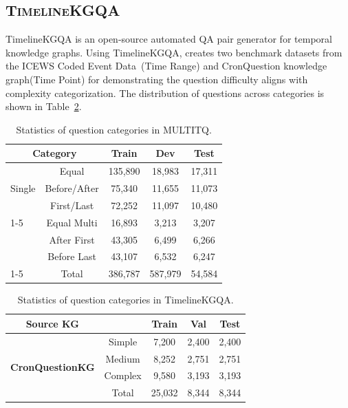 \documentclass[11pt]{article}
\begin{document}
\subsection{\textsc{TimelineKGQA}}
TimelineKGQA is an open-source automated QA pair generator for temporal knowledge graphs. Using TimelineKGQA, \cite{sun2025timelinekgqa} creates two benchmark datasets from the ICEWS Coded Event Data~\cite{DVN/28075_2015}(Time Range) and CronQuestion knowledge graph(Time Point) for demonstrating the question difficulty aligns with complexity categorization. The distribution of questions across categories is shown in Table~\ref{tab:timelinekgqa_static}.
\begin{table}[h]
\caption{Statistics of question categories in MULTITQ.}
\label{tab:multiTQ_stats}
\centering
\small
\begin{tabular}{lcccc}
\toprule
\multicolumn{2}{c}{\textbf{Category}} & \textbf{Train} & \textbf{Dev} & \textbf{Test} \\
\midrule
\multirow{3}{*}{Single} 
  & Equal & 135,890 & 18,983 & 17,311 \\
  & Before/After & 75,340 & 11,655 & 11,073 \\
  & First/Last & 72,252 & 11,097 & 10,480 \\
\cmidrule(lr){1-5}
\multirow{3}{*}{Multiple} 
  & Equal Multi & 16,893 & 3,213 & 3,207 \\
  & After First & 43,305 & 6,499 & 6,266 \\
  & Before Last & 43,107 & 6,532 & 6,247 \\
\cmidrule(lr){1-5}
& Total & 386,787 & 587,979 & 54,584 \\
\bottomrule
\end{tabular}

\end{table}


\begin{table}[h]
\caption{Statistics of question categories in TimelineKGQA.}
\label{tab:timelinekgqa_static}
\centering
\small
\setlength{\tabcolsep}{4pt}
\begin{tabular}{ccccc}
\toprule
\textbf{Source KG} & {} &\textbf{Train} & \textbf{Val} & \textbf{Test} \\
\midrule
\multirow{4}{*}{\textbf{CronQuestionKG}}  &Simple & 7,200 & 2,400 & 2,400 \\
\quad &Medium & 8,252 & 2,751 & 2,751 \\
\quad &Complex & 9,580 & 3,193 & 3,193 \\
\cmidrule(lr){2-5} 
 &Total & 25,032 & 8,344 & 8,344 \\
\bottomrule
\end{tabular}

\end{table}
\end{document}
